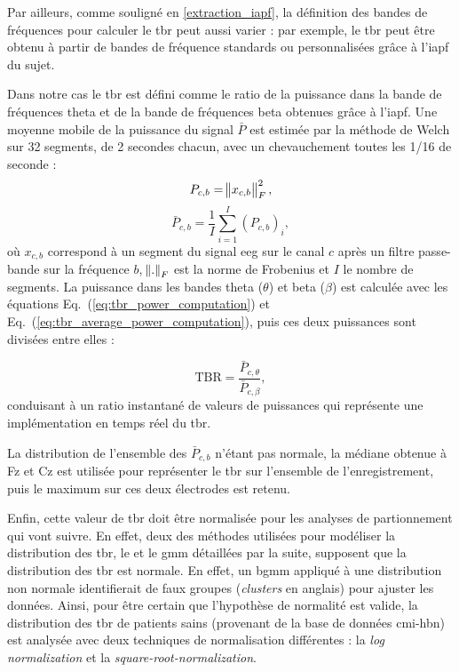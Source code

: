 Par ailleurs, comme souligné en \ref{extraction_iapf}, la définition des bandes de fréquences pour calculer le \gls{tbr} peut aussi varier : par exemple, le \gls{tbr} peut être obtenu à partir
de bandes de fréquence standards ou personnalisées grâce à l'\gls{iapf} du sujet. 

Dans notre cas le \gls{tbr} est défini comme le ratio de la puissance dans la bande de fréquences theta et de la bande de fréquences beta obtenues 
grâce à l'\gls{iapf}. Une moyenne mobile de la puissance du signal $\bar{P}$ est estimée par la méthode de Welch \citep{Welch1967} sur 32 segments, de 2 secondes chacun, avec un 
chevauchement toutes les 1/16 de seconde :
\begin{equation}
\label{eq:tbr_power_computation}
P_{c,b} = \norm{ x_{c,b} }_{F}^2,
\end{equation}
\begin{equation}
\label{eq:tbr_average_power_computation}
\bar{P}_{c,b} = \frac{1}{I} \sum_{i=1}^{I} (P_{c,b})_{i},
\end{equation}
où $x_{c,b}$ correspond à un segment du signal \gls{eeg} sur le canal $c$ après un filtre passe-bande sur la fréquence $b$, $\norm{.}_{F}$ est la norme de Frobenius et $I$ 
le nombre de segments. La puissance dans les bandes theta ($\theta$) et beta ($\beta$) est calculée avec les équations Eq.~(\ref{eq:tbr_power_computation}) et Eq.~(\ref{eq:tbr_average_power_computation}),
puis ces deux puissances sont divisées entre elles :

\begin{equation}
\label{eq:tbr_tbr_computation}
\text{TBR} = \frac{\bar{P}_{c,\theta}}{\bar{P}_{c,\beta}},
\end{equation}
conduisant à un ratio instantané de valeurs de puissances qui représente une implémentation en temps réel du \gls{tbr}.

La distribution de l'ensemble des $\bar{P}_{c,b}$ n'étant pas normale, la médiane obtenue à Fz et Cz est utilisée pour représenter le \gls{tbr} sur l'ensemble 
de l'enregistrement, puis le maximum sur ces deux électrodes est retenu.

Enfin, cette valeur de \gls{tbr} doit être normalisée pour les analyses de partionnement qui vont suivre. En effet, deux des méthodes utilisées pour modéliser la distribution des \gls{tbr},
le  et le \gls{gmm} détaillées par la suite, supposent que la distribution des \gls{tbr} est normale. 
En effet, un \gls{bgmm} appliqué à une distribution non normale identifierait de faux groupes (\textit{clusters} en anglais) pour ajuster les données. 
Ainsi, pour être certain que l'hypothèse de normalité est valide, la distribution des \gls{tbr} de patients sains (provenant de la base de données \gls{cmi-hbn})
est analysée avec deux techniques de normalisation différentes : la \textit{log normalization} et la \textit{square-root-normalization}.

